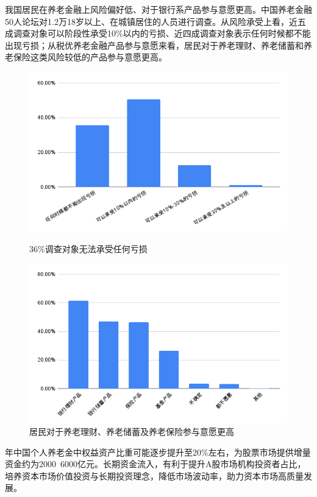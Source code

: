\documentclass[a4paper,zihao=5]{ctexart}
\begin{document}
我国居民在养老金融上风险偏好低、对于银行系产品参与意愿更高。中国养老金融50人论坛对1.2万18岁以上、在城镇居住的人员进行调查。从风险承受上看，近五成调查对象可以阶段性承受10\%以内的亏损、近四成调查对象表示任何时候都不能出现亏损；从税优养老金融产品参与意愿来看，居民对于养老理财、养老储蓄和养老保险这类风险较低的产品参与意愿更高。
\begin{figure}[H]
    \begin{minipage}{0.48\linewidth}
        \includegraphics[width=\linewidth]{img/36调查对象无法承受任何亏损.png}
        \caption{36\%调查对象无法承受任何亏损}
    \end{minipage}
    \begin{minipage}{0.48\linewidth}
        \includegraphics[width=\linewidth]{img/居民对于养老理财、养老储蓄及养老保险参与意愿更高.png}
        \caption{居民对于养老理财、养老储蓄及养老保险参与意愿更高}
    \end{minipage}
\end{figure}
年中国个人养老金中权益资产比重可能逐步提升至20\%左右，为股票市场提供增量资金约为2000~6000亿元。长期资金流入，有利于提升A股市场机构投资者占比，培养资本市场价值投资与长期投资理念，降低市场波动率，助力资本市场高质量发展。
\end{document}
